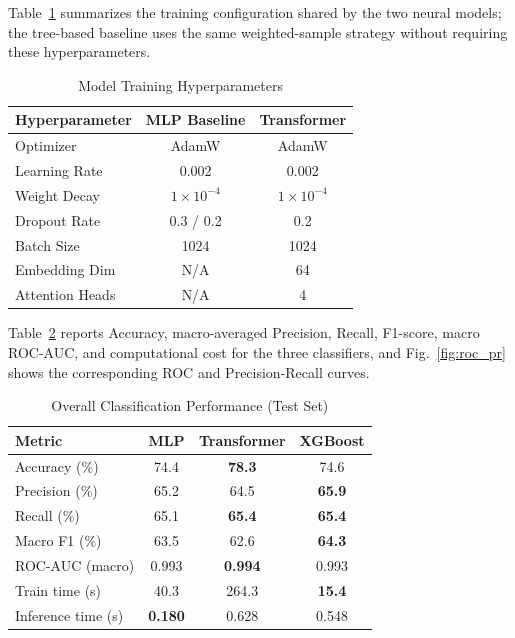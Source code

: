 Table~\ref{tab:hyperparams} summarizes the training configuration shared by the two neural models; the tree-based baseline uses the same weighted-sample strategy without requiring these hyperparameters.

\begin{table}[t]
\caption{Model Training Hyperparameters}
\begin{center}
\begin{tabular}{|l|c|c|}
\hline
\textbf{Hyperparameter} & \textbf{MLP Baseline} & \textbf{Transformer} \\
\hline
Optimizer & AdamW & AdamW \\
Learning Rate & 0.002 & 0.002 \\
Weight Decay & $1 \times 10^{-4}$ & $1 \times 10^{-4}$ \\
Dropout Rate & 0.3 / 0.2 & 0.2 \\
Batch Size & 1024 & 1024 \\
Embedding Dim & N/A & 64 \\
Attention Heads & N/A & 4 \\
\hline
\end{tabular}
\label{tab:hyperparams}
\end{center}
\end{table}

Table~\ref{tab:perf} reports Accuracy, macro-averaged Precision, Recall, F1-score, macro ROC-AUC, and computational cost for the three classifiers, and Fig.~\ref{fig:roc_pr} shows the corresponding ROC and Precision-Recall curves.

\begin{table}[t]
\caption{Overall Classification Performance (Test Set)}
\begin{center}
\begin{tabular}{|l|c|c|c|}
\hline
\textbf{Metric} & \textbf{MLP} & \textbf{Transformer} & \textbf{XGBoost} \\
\hline
Accuracy (\%)     & 74.4  & \textbf{78.3}  & 74.6 \\
Precision (\%)    & 65.2  & 64.5  & \textbf{65.9} \\
Recall (\%)       & 65.1  & \textbf{65.4}  & \textbf{65.4} \\
Macro F1 (\%)     & 63.5  & 62.6  & \textbf{64.3} \\
ROC-AUC (macro)   & 0.993 & \textbf{0.994} & 0.993 \\
Train time (s)    & 40.3  & 264.3 & \textbf{15.4} \\
Inference time (s)& \textbf{0.180} & 0.628 & 0.548 \\
\hline
\end{tabular}
\end{center}
\label{tab:perf}
\end{table}


